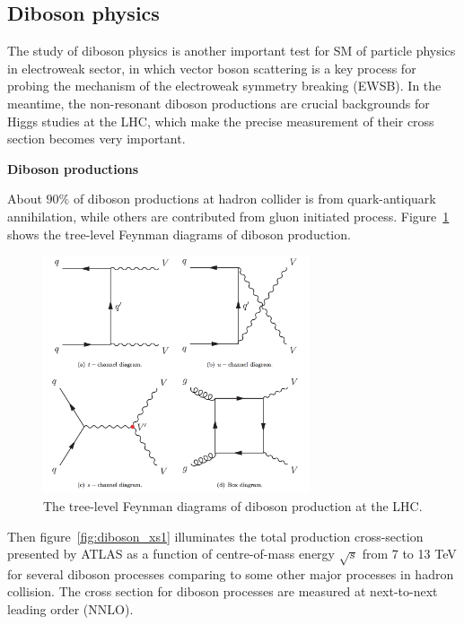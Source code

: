 \subsection{Diboson physics}
\label{diboson}

The study of diboson physics is another important test for SM of particle physics in electroweak sector, 
in which vector boson scattering is a key process for probing the mechanism of the electroweak symmetry breaking (EWSB).
In the meantime, the non-resonant diboson productions are crucial backgrounds for Higgs studies at the LHC, which make the precise measurement of their cross section becomes very important.

\textbf{Diboson productions}

About $90\%$ of diboson productions at hadron collider is from quark-antiquark annihilation,
while others are contributed from gluon initiated process.
Figure~\ref{fig:diboson_fd1} shows the tree-level Feynman diagrams of diboson production.
\begin{figure}[!htb]
  \centering
  \includegraphics[width=0.7\textwidth]{figures/Theory/diboson_prod_fey.png}
  \caption{The tree-level Feynman diagrams of diboson production at the LHC.}
  \label{fig:diboson_fd1}
\end{figure}
Then figure~\ref{fig:diboson_xs1} illuminates the total production cross-section presented by ATLAS
as a function of centre-of-mass energy $\sqrt{s}$ from 7 to 13 TeV for several diboson processes comparing 
to some other major processes in hadron collision.
The cross section for diboson processes are measured at next-to-next leading order (NNLO). 
